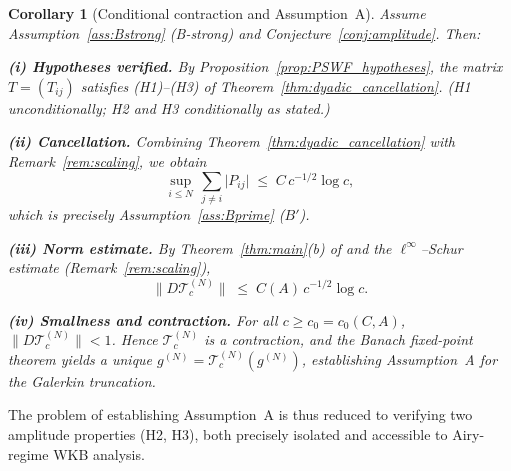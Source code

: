 \documentclass[12pt]{amsart}
\newtheorem{corollary}[theorem]{Corollary}
\theoremstyle{definition}
\theoremstyle{remark}
\newcommand{\norm}[1]{\lVert#1\rVert}
\newcommand{\abs}[1]{\lvert#1\rvert}
\begin{document}
\begin{corollary}[Conditional contraction and Assumption~A]
\label{cor:closure}
Assume Assumption~\ref{ass:Bstrong} \textup{(B-strong)}
and Conjecture~\ref{conj:amplitude}.
Then:

\medskip\noindent
\textbf{(i) Hypotheses verified.}
By Proposition~\ref{prop:PSWF_hypotheses},
the matrix $T = (T_{ij})$ satisfies \textup{(H1)--(H3)}
of Theorem~\ref{thm:dyadic_cancellation}.
(H1 unconditionally; H2 and H3 conditionally as stated.)

\medskip\noindent
\textbf{(ii) Cancellation.}
Combining Theorem~\ref{thm:dyadic_cancellation}
with Remark~\ref{rem:scaling}, we obtain
\[
  \sup_{i \leq N}\,\sum_{j \neq i} \abs{P_{ij}}
  \;\leq\; C\,c^{-1/2}\log c,
\]
which is precisely Assumption~\ref{ass:Bprime}
\textup{($B'$)}.

\medskip\noindent
\textbf{(iii) Norm estimate.}
By Theorem~\ref{thm:main}\textup{(b)} of \cite{paperVI}
and the $\ell^\infty$--Schur estimate
(Remark~\ref{rem:scaling}),
\[
  \norm{D\mathcal{T}_c^{(N)}}
  \;\leq\; C(A)\,c^{-1/2}\log c.
\]

\medskip\noindent
\textbf{(iv) Smallness and contraction.}
For all $c \geq c_0 = c_0(C,A)$,
$\norm{D\mathcal{T}_c^{(N)}} < 1$.
Hence $\mathcal{T}_c^{(N)}$ is a contraction,
and the Banach fixed-point theorem yields a unique
$g^{(N)} = \mathcal{T}_c^{(N)}(g^{(N)})$,
establishing Assumption~A for the Galerkin truncation.
\end{corollary}

The problem of establishing Assumption~A is thus reduced
to verifying two amplitude properties (H2, H3),
both precisely isolated and accessible to Airy-regime
WKB analysis.

\medskip
\begin{center}
\end{center}
\end{document}
